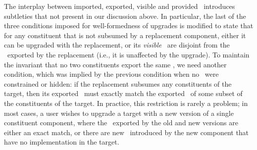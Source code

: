 The interplay between imported, exported, visible and provided \apisN\
introduces subtleties that not present in our discussion above.
In particular,
the last of the three conditions imposed for well-formedness of upgrades
is modified to state
that for any constituent that is not subsumed by a replacement component,
either it can be upgraded with the replacement,
or its \emph{visible} \apisN\ are disjoint
from the \apisN\ exported by the replacement
(i.e., it is unaffected by the upgrade).
To maintain the invariant that no two constituents export
the same \apiN,
we need another condition,
which was implied by the previous condition
when no \apisN\ were constrained or hidden:
if the replacement subsumes any constituents of the target,
then its exported \apisN\ must exactly match
the exported \apisN\ of some subset of the constituents of the target.
In practice, this restriction is rarely a problem;
in most cases, a user wishes to upgrade a target
with a new version of a single constituent component,
where the \apisN\ exported by the old and new versions
are either an exact match,
or there are new \apisN\ introduced by the new component
that have no implementation in the target.
